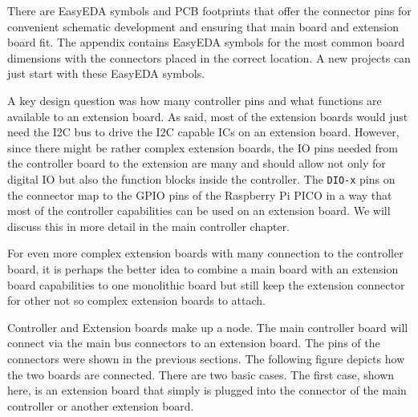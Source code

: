 There are EasyEDA symbols and PCB footprints that offer the connector pins for convenient schematic development and ensuring that main board and extension board fit. The appendix contains EasyEDA symbols for the most common board dimensions with the connectors placed in the correct location. A new projects can just start with these EasyEDA symbols.

A key design question was how many controller pins and what functions are available to an extension board. As said, most of the extension boards would just need the I2C bus to drive the I2C capable ICs on an extension board. However, since there might be rather complex extension boards, the IO pins needed from the controller board to the extension are many and should allow not only for digital IO but also the function blocks inside the controller. The \texttt{DIO-x} pins on the connector map to the GPIO pins of the Raspberry Pi PICO in a way that most of the controller capabilities can be used on an extension board. We will discuss this in more detail in the main controller chapter.

For even more complex extension boards with many connection to the controller board, it is perhaps the better idea to combine a main board with an extension board capabilities to one monolithic board but still keep the extension connector for other not so complex extension boards to attach. 


Controller and Extension boards make up a node. The main controller board will connect via the main bus connectors to an extension board. The pins of the connectors were shown in the previous sections. The following figure depicts how the two boards are connected. There are two basic cases. The first case, shown here, is an extension board that simply is plugged into the connector of the main controller or another extension board.

